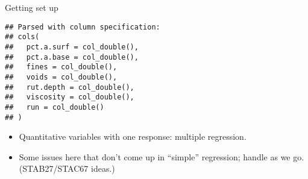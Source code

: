\begin{frame}[fragile]{Getting set up}
\protect\hypertarget{getting-set-up}{}
\begin{Shaded}
\begin{Highlighting}[]
\StringTok{ }\NormalTok{)}
\end{Highlighting}
\end{Shaded}

\begin{verbatim}
## Parsed with column specification:
## cols(
##   pct.a.surf = col_double(),
##   pct.a.base = col_double(),
##   fines = col_double(),
##   voids = col_double(),
##   rut.depth = col_double(),
##   viscosity = col_double(),
##   run = col_double()
## )
\end{verbatim}

\begin{itemize}
\tightlist
\item
  Quantitative variables with one response: multiple regression.
\item
  Some issues here that don't come up in ``simple'' regression; handle
  as we go. (STAB27/STAC67 ideas.)
\end{itemize}
\end{frame}

